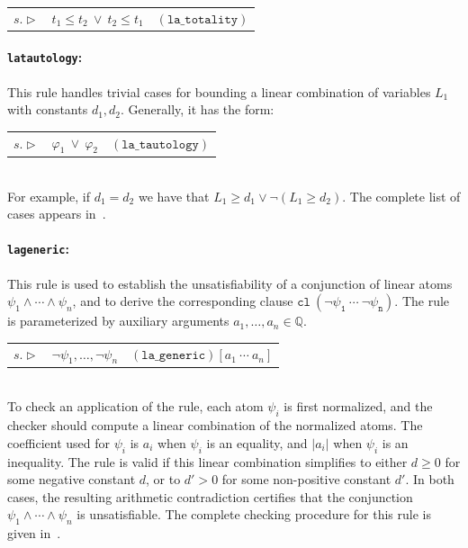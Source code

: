 \noindent\begin{tabularx}{\linewidth}{ l C r }
	$s.\triangleright$ & 
	$t_1\leq t_2 \: \lor \: t_2\leq t_1$ & 
	${\mathtt{(la\_totality)}}$
\end{tabularx}

\paragraph{\texttt{la\textunderscore tautology}:} This rule handles trivial cases for bounding a linear combination of variables $L_1$ with constants $d_1,d_2$. Generally, it has the form:

\noindent\begin{tabularx}{\linewidth}{ l C r }
	$s.\triangleright$ & 
	$\varphi_1 \: \lor \: \varphi_2$ & 
	${\mathtt{(la\_tautology)}}$
\end{tabularx} \\

For example, if $d_1=d_2$ we have that $L_1\geq d_1 \lor \lnot(L_1\geq d_2)$. The complete list of cases appears in~\cite{ScFlBaFo21}.

\paragraph{\texttt{la\textunderscore generic}:}
This rule is used to establish the unsatisfiability of a conjunction of linear atoms
$\psi_1 \wedge \cdots \wedge \psi_n$, and to derive the corresponding clause
$\mathtt{cl \: (\lnot\psi_1 \: \cdots \: \lnot\psi_n)}$.
The rule is parameterized by auxiliary arguments
$a_1,\ldots,a_n \in \mathbb{Q}$.

\noindent\begin{tabularx}{\linewidth}{ l C r }
	$s.\triangleright$ & 
	$\lnot\psi_1,\dots,\lnot\psi_n$ & 
	${\mathtt{(la\_generic)}[a_1 \: \cdots \: a_n]}$
\end{tabularx} \\

To check an application of the rule, each atom $\psi_i$ is first normalized, and the checker should compute a linear combination of the normalized atoms. The coefficient used for $\psi_i$ is $a_i$ when $\psi_i$ is an equality, and $|a_i|$ when $\psi_i$ is an inequality. The rule is valid if this linear combination simplifies to either $d \geq 0$ for some negative constant $d$, or to $d' > 0$ for some non-positive constant $d'$. In both cases, the resulting arithmetic contradiction certifies that the conjunction $\psi_1 \wedge \cdots \wedge \psi_n$ is unsatisfiable.
The complete checking procedure for this rule is given in~\cite{ScFlBaFo21}.




